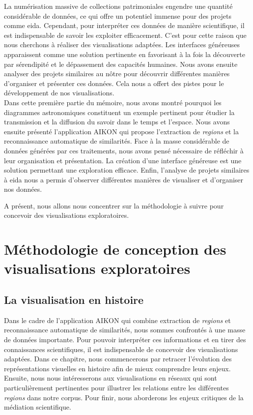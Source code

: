 \documentclass[a4paper,12pt,twoside]{book}
\newcommand{\clearemptydoublepage}{\newpage{\pagestyle{empty}\cleardoublepage}}
\begin{document}
	La numérisation massive de collections patrimoniales engendre une quantité considérable de données, ce qui offre un potentiel immense pour des projets comme \gls{eida}. Cependant, pour interpréter ces données de manière scientifique, il est indispensable de savoir les exploiter efficacement. C'est pour cette raison que nous cherchons à réaliser des visualisations adaptées. Les \og interfaces généreuses \fg apparaissent comme une solution pertinente en favorisant à la fois la découverte par sérendipité et le dépassement des capacités humaines. Nous avons ensuite analyser des projets similaires au nôtre pour découvrir différentes manières d'organiser et présenter ces données. Cela nous a offert des pistes pour le développement de nos visualisations. \\
	
	Dans cette première partie du mémoire, nous avons montré pourquoi les diagrammes astronomiques constituent un exemple pertinent pour étudier la transmission et la diffusion du savoir dans le temps et l'espace. Nous avons ensuite présenté l'application AIKON qui propose l'extraction de \textit{regions} et la reconnaissance automatique de similarités. Face à la masse considérable de données générées par ces traitements, nous avons pensé nécessaire de réfléchir à leur organisation et présentation. La création d'une \og interface généreuse \fg est une solution permettant une exploration efficace. Enfin, l'analyse de projets similaires à \gls{eida} nous a permis d'observer différentes manières de visualiser et d'organiser nos données.
	
	A présent, nous allons nous concentrer sur la méthodologie à suivre pour concevoir des visualisations exploratoires.
	
	\clearemptydoublepage
	
	
	\part{Méthodologie de conception des visualisations exploratoires}
	\chapter{La visualisation en histoire}
	
	Dans le cadre de l'application AIKON qui combine extraction de \textit{regions} et reconnaissance automatique de similarités, nous sommes confrontés à une masse de données importante. Pour pouvoir interpréter ces informations et en tirer des connaissances scientifiques, il est indispensable de concevoir des visualisations adaptées. Dans ce chapitre, nous commencerons par retracer l'évolution des représentations visuelles en histoire afin de mieux comprendre leurs enjeux. Ensuite, nous nous intéresserons aux visualisations en réseaux qui sont particulièrement pertinentes pour illustrer les relations entre les différentes \textit{regions} dans notre corpus. Pour finir, nous aborderons les enjeux critiques de la médiation scientifique.
	 
\end{document}

